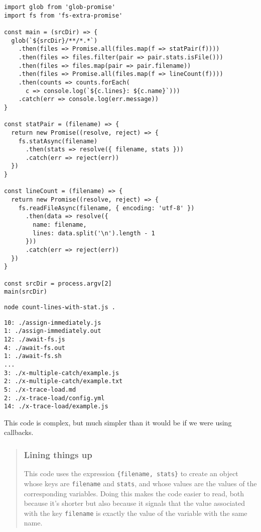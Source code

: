 \documentclass[krantzl]{krantz}
\newenvironment{callout}{\savenotes\begin{tBox}\begin{quotation}\toggletrue{inbox}\renewcommand{\thempfootnote}{\arabic{footnote}}}{\end{quotation}\vspace{\baselineskip}\end{tBox}\togglefalse{inbox}\spewnotes}
\begin{document}
\begin{lstlisting}[frame=single,frameround=tttt]
import glob from 'glob-promise'
import fs from 'fs-extra-promise'

const main = (srcDir) => {
  glob(`${srcDir}/**/*.*`)
    .then(files => Promise.all(files.map(f => statPair(f))))
    .then(files => files.filter(pair => pair.stats.isFile()))
    .then(files => files.map(pair => pair.filename))
    .then(files => Promise.all(files.map(f => lineCount(f))))
    .then(counts => counts.forEach(
      c => console.log(`${c.lines}: ${c.name}`)))
    .catch(err => console.log(err.message))
}

const statPair = (filename) => {
  return new Promise((resolve, reject) => {
    fs.statAsync(filename)
      .then(stats => resolve({ filename, stats }))
      .catch(err => reject(err))
  })
}

const lineCount = (filename) => {
  return new Promise((resolve, reject) => {
    fs.readFileAsync(filename, { encoding: 'utf-8' })
      .then(data => resolve({
        name: filename,
        lines: data.split('\n').length - 1
      }))
      .catch(err => reject(err))
  })
}

const srcDir = process.argv[2]
main(srcDir)
\end{lstlisting}



\begin{lstlisting}[frame=single,frameround=tttt]
node count-lines-with-stat.js .
\end{lstlisting}



\begin{lstlisting}[frame=single,frameround=tttt]
10: ./assign-immediately.js
1: ./assign-immediately.out
12: ./await-fs.js
4: ./await-fs.out
1: ./await-fs.sh
...
3: ./x-multiple-catch/example.js
2: ./x-multiple-catch/example.txt
5: ./x-trace-load.md
2: ./x-trace-load/config.yml
14: ./x-trace-load/example.js
\end{lstlisting}



\noindent This code is complex, but much simpler than it would be if we were using callbacks.

\begin{callout}


\subsubsection*{Lining things up}


This code uses the expression \texttt{\{filename, stats\}}
to create an object whose keys are \texttt{filename} and \texttt{stats},
and whose values are the values of the corresponding variables.
Doing this makes the code easier to read,
both because it's shorter
but also because it signals that the value associated with the key \texttt{filename}
is exactly the value of the variable with the same name.

\end{callout}
\end{document}
